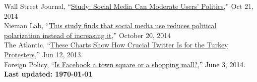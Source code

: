 \documentclass[margin,line,11pt]{resume}
\newcommand{\nl}{\vspace{0.10in}\\}
\begin{document}
\begin{resume}
Wall Street Journal, ``\href{http://blogs.wsj.com/washwire/2014/10/21/study-social-media-can-moderate-users-politics/}{Study: Social Media Can Moderate Users' Politics},'' Oct 21, 2014\nl
Nieman Lab, ``\href{http://www.niemanlab.org/2014/10/this-study-finds-that-social-media-use-reduces-political-polarization-instead-of-increasing-it/}{This study finds that social media use reduces political polarization instead of increasing it},'' October 20, 2014\nl
The Atlantic, ``\href{http://www.theatlantic.com/international/archive/2013/06/these-charts-show-how-crucial-twitter-is-for-the-turkey-protesters/276798/}{These Charts Show How Crucial Twitter Is for the Turkey Protesters},'' Jun 12, 2013.\nl
Foreign Policy, ``\href{http://foreignpolicy.com/2013/06/03/is-facebook-a-town-square-or-a-shopping-mall/}{Is Facebook a town square or a shopping mall?},'' June 3, 2014.\nl

\centering \textbf{Last updated: \today}
    
\end{resume}
\end{document}
